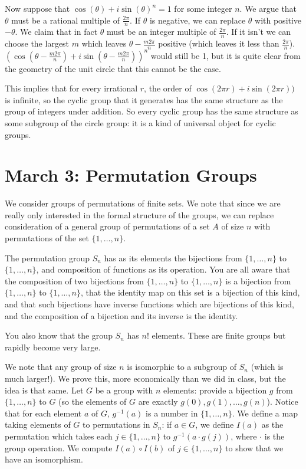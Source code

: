 \documentclass[12pt]{article}
\begin{document}
Now suppose that $\cos(\theta) + i\sin(\theta)^n = 1$ for some integer $n$.  We argue that $\theta$ must be a rational multiple of $\frac{2\pi}n$.  If $\theta$ is negative, we can replace $\theta$ with positive $-\theta$.  We claim that in fact $\theta$ must be an integer multiple of $\frac{2\pi}n$.  If it isn't we can choose the largest $m$ which leaves $\theta - \frac{m2\pi}n$ positive (which leaves it less than $\frac{2\pi}n$).  $(\cos(\theta -\frac{m2\pi}n) + i\sin(\theta - \frac{m2\pi}n))^n$ would still be 1, but it is quite clear from the geometry of the unit circle that this cannot be the case.

This implies that for every irrational $r$, the order of $\cos(2\pi r) + i\sin(2\pi r))$ is infinite, so the cyclic group that it generates has the same structure as the group of integers under addition.  So every cyclic group has the same structure as some subgroup of the circle group:  it is a kind of universal object for cyclic groups.

\section{March 3: Permutation Groups}

We consider groups of permutations of finite sets.  We note that since we are really only interested in the formal structure of the groups,
we can replace consideration of a general group of permutations of a set $A$ of size $n$ with permutations of the set $\{1,\ldots,n\}$.

The permutation group $S_n$ has as its elements the bijections from $\{1,\ldots,n\}$ to $\{1,\ldots,n\}$, and composition of functions as its operation.
You are all aware that the composition of two bijections from $\{1,\ldots,n\}$ to $\{1,\ldots,n\}$ is a bijection from $\{1,\ldots,n\}$ to $\{1,\ldots,n\}$, that  the identity map on this set is a bijection of this kind, and that such bijections have inverse functions which are bijections of this kind, and the composition of a bijection and its inverse is the identity.

You also know that the group $S_n$ has $n!$ elements.  These are finite groups but rapidly become very large.

We note that any group of size $n$ is isomorphic to a subgroup of $S_n$ (which is much larger!).  We prove this, more economically than we did in class, but the idea is that same.  Let $G$ be a group with $n$ elements:  provide a bijection $g$ from $\{1,\ldots,n\}$ to $G$ (so the elements of $G$ are
exactly $g(0), g(1),\ldots,g(n)$).  Notice that for each element $a$ of $G$, $g^{-1}(a)$ is a number in $\{1,\ldots,n\}$. We define a map taking elements of $G$ to permutations in $S_n$:  if $a \in G$, we define $I(a)$ as the permutation which takes each $j \in \{1,\ldots,n\}$ to $g^{-1}(a \cdot g(j))$, where $\cdot$ is the group operation.  We compute $I(a) \circ I(b)$ of $j \in \{1,\ldots,n\}$ to show that we have an isomorphism.
\end{document}
